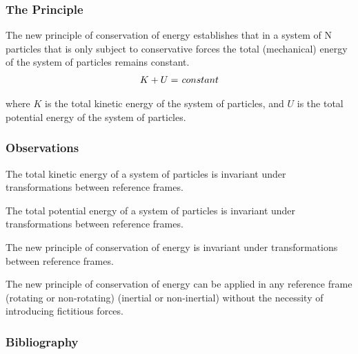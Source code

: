 \documentclass[10pt]{article}
\newcommand{\mK}{K}
\newcommand{\mU}{U}
\begin{document}
\newpage

{\centering\subsubsection*{The Principle}}

\vspace{+0.90em}

\par The new principle of conservation of energy establishes that in a system of N particles that is only subject to conservative forces the total (mechanical) energy of the system of particles remains constant.
\smallskip
\begin{eqnarray*}
\mK + \mU = \hspace{+0.09em} constant
\end{eqnarray*}
\vspace{-0.30em}
\par \noindent where $K$ is the total kinetic energy of the system of particles, and $U$ is the total potential energy of the system of particles.

\vspace{+1.20em}

{\centering\subsubsection*{Observations}}

\vspace{+0.90em}

\par The total kinetic energy of a system of particles is invariant under transformations between reference frames.
\bigskip
\par The total potential energy of a system of particles is invariant under transformations between reference frames.
\bigskip
\par The new principle of conservation of energy is invariant under transformations between reference frames.
\bigskip
\par The new principle of conservation of energy can be applied in any reference frame (rotating or non-rotating) (inertial or non-inertial) without the necessity of introducing fictitious forces.

\vspace{+1.50em}

{\centering\subsubsection*{Bibliography}}
\end{document}
